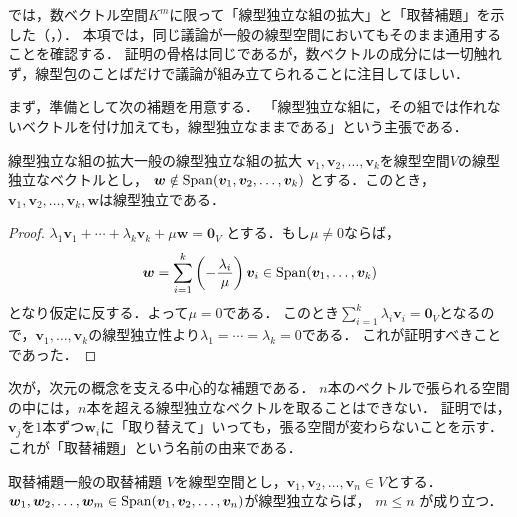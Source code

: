 では，数ベクトル空間$K^m$に限って「線型独立な組の拡大」と「取替補題」を示した（，）．
本項では，同じ議論が一般の線型空間においてもそのまま通用することを確認する．
証明の骨格は同じであるが，数ベクトルの成分には一切触れず，線型包のことばだけで議論が組み立てられることに注目してほしい．

まず，準備として次の補題を用意する．
「線型独立な組に，その組では作れないベクトルを付け加えても，線型独立なままである」という主張である．

\begin{lemma}{線型独立な組の拡大}{一般の線型独立な組の拡大}
  $\bm{v}_1, \bm{v}_2, \dots, \bm{v}_k$を線型空間$V$の線型独立なベクトルとし，
  $\bm{w} \notin \operatorname{Span}(\bm{v}_1, \bm{v}_2, \dots, \bm{v}_k)$
  とする．このとき，$\bm{v}_1, \bm{v}_2, \dots, \bm{v}_k, \bm{w}$は線型独立である．
\end{lemma}

\begin{tleftbar}
\begin{proof}
  $\lambda_1 \bm{v}_1 + \cdots + \lambda_k \bm{v}_k + \mu \bm{w} = \bm{0}_V$
  とする．もし$\mu \ne 0$ならば，
  \[
    \bm{w} = \sum_{i=1}^{k} \left(-\frac{\lambda_i}{\mu}\right) \bm{v}_i
    \in \Span(\bm{v}_1, \dots, \bm{v}_k)
  \]
  となり仮定に反する．よって$\mu = 0$である．
  このとき$\sum_{i=1}^{k} \lambda_i \bm{v}_i = \bm{0}_V$となるので，$\bm{v}_1, \dots, \bm{v}_k$の線型独立性より$\lambda_1 = \cdots = \lambda_k = 0$である．
  これが証明すべきことであった．
\end{proof}
\end{tleftbar}

次が，次元の概念を支える中心的な補題である．
$n$本のベクトルで張られる空間の中には，$n$本を超える線型独立なベクトルを取ることはできない．
証明では，$\bm{v}_j$を$1$本ずつ$\bm{w}_i$に「取り替えて」いっても，張る空間が変わらないことを示す．
これが「取替補題」という名前の由来である．

\begin{lemma}{取替補題}{一般の取替補題}
  $V$を線型空間とし，$\bm{v}_1, \bm{v}_2, \dots, \bm{v}_n \in V$とする．
  $\bm{w}_1, \bm{w}_2, \dots, \bm{w}_m \in \operatorname{Span}(\bm{v}_1, \bm{v}_2, \dots, \bm{v}_n)$が線型独立ならば，
  $m \le n$
  が成り立つ．
\end{lemma}


